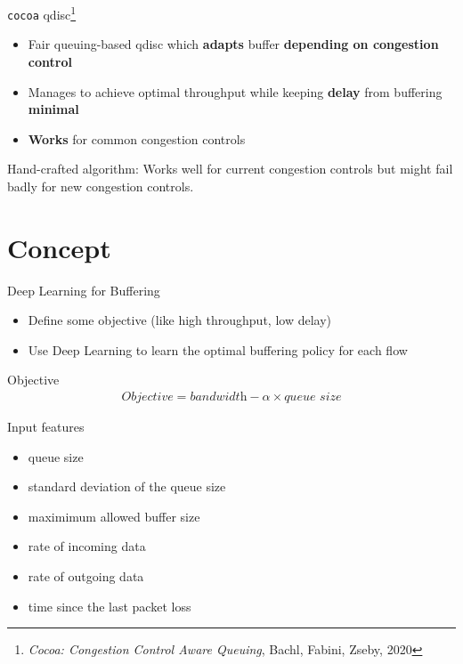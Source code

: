 \documentclass[xcolor={dvipsnames}]{beamer}
\begin{document}
\begin{frame}{\texttt{cocoa} qdisc\footnote{\textit{Cocoa: Congestion Control Aware Queuing}, Bachl, Fabini, Zseby, 2020}}
\begin{itemize}
\item Fair queuing-based qdisc which \textbf{adapts} buffer \textbf{depending on congestion control}
\item Manages to achieve optimal throughput while keeping \textbf{delay} from buffering \textbf{minimal}
\item \textbf{Works} for common congestion controls
\end{itemize}
\pause
\begin{alertblock}{Hand-crafted algorithm:}
Works well for current congestion controls but might fail badly for new congestion controls.
\end{alertblock}
\end{frame}

\section{Concept}

\begin{frame}{Deep Learning for Buffering}
\begin{itemize}
\item Define some objective (like high throughput, low delay)
\item Use Deep Learning to learn the optimal buffering policy for each flow
\end{itemize}
\end{frame}

\begin{frame}{Objective}
\begin{align*}
\textit{Objective} = \textit{bandwidth}-\alpha\times\textit{queue size}
\end{align*}
\end{frame}

\begin{frame}{Input features}
\begin{itemize}
\item queue size
\item standard deviation of the queue size 
\item maximimum allowed buffer size
\item rate of incoming data
\item rate of outgoing data
\item time since the last packet loss
\end{itemize}
\end{frame}
\end{document}
